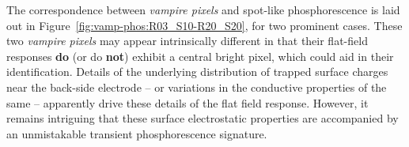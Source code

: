 

The correspondence between {\it vampire pixels} and spot-like phosphorescence is laid out in Figure~\ref{fig:vamp-phos:R03_S10-R20_S20}, for two prominent cases.  These two {\it vampire pixels} may appear intrinsically different in that their flat-field responses {\bf do} (or do {\bf not}) exhibit a central bright pixel, which could aid in their identification. Details of the underlying distribution of trapped surface charges near the back-side electrode -- or variations in the conductive properties of the same -- apparently drive these details of the flat field response. However, it remains intriguing that these surface electrostatic properties are accompanied by an unmistakable transient phosphorescence signature.



